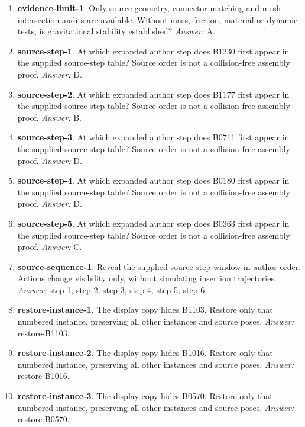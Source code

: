 \begin{enumerate}
\item \textbf{evidence-limit-1}. Only source geometry, connector matching and mesh intersection audits are available. Without mass, friction, material or dynamic tests, is gravitational stability established? \textit{Answer:} A.
\item \textbf{source-step-1}. At which expanded author step does B1230 first appear in the supplied source-step table? Source order is not a collision-free assembly proof. \textit{Answer:} D.
\item \textbf{source-step-2}. At which expanded author step does B1177 first appear in the supplied source-step table? Source order is not a collision-free assembly proof. \textit{Answer:} B.
\item \textbf{source-step-3}. At which expanded author step does B0711 first appear in the supplied source-step table? Source order is not a collision-free assembly proof. \textit{Answer:} D.
\item \textbf{source-step-4}. At which expanded author step does B0180 first appear in the supplied source-step table? Source order is not a collision-free assembly proof. \textit{Answer:} D.
\item \textbf{source-step-5}. At which expanded author step does B0363 first appear in the supplied source-step table? Source order is not a collision-free assembly proof. \textit{Answer:} C.
\item \textbf{source-sequence-1}. Reveal the supplied source-step window in author order. Actions change visibility only, without simulating insertion trajectories. \textit{Answer:} step-1, step-2, step-3, step-4, step-5, step-6.
\item \textbf{restore-instance-1}. The display copy hides B1103. Restore only that numbered instance, preserving all other instances and source poses. \textit{Answer:} restore-B1103.
\item \textbf{restore-instance-2}. The display copy hides B1016. Restore only that numbered instance, preserving all other instances and source poses. \textit{Answer:} restore-B1016.
\item \textbf{restore-instance-3}. The display copy hides B0570. Restore only that numbered instance, preserving all other instances and source poses. \textit{Answer:} restore-B0570.
\end{enumerate}
